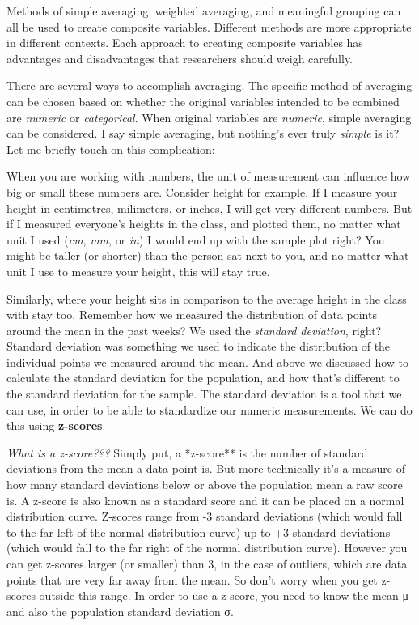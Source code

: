 \documentclass[
]{book}
\begin{document}
Methods of simple averaging, weighted averaging, and meaningful grouping can all be used to create composite variables. Different methods are more appropriate in different contexts. Each approach to creating composite variables has advantages and disadvantages that researchers should weigh carefully.

There are several ways to accomplish averaging. The specific method of averaging can be chosen based on whether the original variables intended to be combined are \emph{numeric} or \emph{categorical}. When original variables are \emph{numeric}, simple averaging can be considered. I say simple averaging, but nothing's ever truly \emph{simple} is it? Let me briefly touch on this complication:

When you are working with numbers, the unit of measurement can influence how big or small these numbers are. Consider height for example. If I measure your height in centimetres, milimeters, or inches, I will get very different numbers. But if I measured everyone's heights in the class, and plotted them, no matter what unit I used (\emph{cm}, \emph{mm}, or \emph{in}) I would end up with the sample plot right? You might be taller (or shorter) than the person sat next to you, and no matter what unit I use to measure your height, this will stay true.

Similarly, where your height sits in comparison to the average height in the class with stay too. Remember how we measured the distribution of data points around the mean in the past weeks? We used the \emph{standard deviation}, right? Standard deviation was something we used to indicate the distribution of the individual points we measured around the mean. And above we discussed how to calculate the standard deviation for the population, and how that's different to the standard deviation for the sample. The standard deviation is a tool that we can use, in order to be able to standardize our numeric measurements. We can do this using \textbf{z-scores}.

\emph{What is a z-score???} Simply put, a *z-score** is the number of standard deviations from the mean a data point is. But more technically it's a measure of how many standard deviations below or above the population mean a raw score is. A z-score is also known as a standard score and it can be placed on a normal distribution curve. Z-scores range from -3 standard deviations (which would fall to the far left of the normal distribution curve) up to +3 standard deviations (which would fall to the far right of the normal distribution curve). However you can get z-scores larger (or smaller) than 3, in the case of outliers, which are data points that are very far away from the mean. So don't worry when you get z-scores outside this range. In order to use a z-score, you need to know the mean μ and also the population standard deviation σ.
\end{document}
